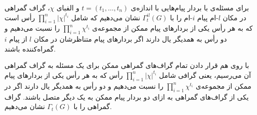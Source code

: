 \begin{definition}
	برای مسئله‌ی
	\icodg
	با بردار پیام‌هایی با اندازه‌ی
	$t = (t_1, \ldots, t_n)$
	و الفبای
	$\chi$،
	گراف گمراهی در مکان
	$l$-ام
	پیام
	$i$-ام
	را با
	$\Gamma_t^{il}(G)$
	نشان می‌دهیم که شامل
	$\prod_{i = 1}^n |\chi|^{t_i}$
	رأس است که به هر رأس یکی از بردارهای پیام ممکن از مجموعه‌ی
	$\prod_{i = 1}^n \chi^{t_i}$
	را نسبت می‌دهیم و دو رأس به همدیگر یال دارند اگر بردارهای پیام متناظرشان در مکان
	$l$
	از پیام
	$i$
	گمراه‌کننده باشند.
\end{definition}
\begin{definition}
	\label{def:confusiongraph}
	با روی هم قرار دادن تمام گراف‌های گمراهی ممکن برای یک مسئله به گراف گمراهی آن می‌رسیم، یعنی گرافی شامل
	$\prod_{i = 1}^n |\chi|^{t_i}$
	رأس که به هر رأس یکی از بردارهای پیام ممکن از مجموعه‌ی
	$\prod_{i = 1}^n \chi^{t_i}$
	را نسبت می‌دهیم و دو رأس به همدیگر یال دارند اگر در یکی از گراف‌های گمراهی به ازای دو بردار پیام ممکن به یک دیگر متصل باشند. گراف گمراهی را با
	$\Gamma_t(G)$
	نشان می‌دهیم.
\end{definition}
